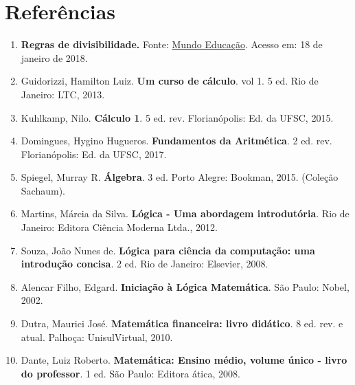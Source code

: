 \chapter*{Referências}
 
 \begin{enumerate}[(1)]
  \item \textbf{Regras de divisibilidade.} Fonte: \href{http://mundoeducacao.bol.uol.com.br/matematica/regras-divisibilidade.htm}{Mundo Educação}. Acesso em: 18 de janeiro de 2018.
  
  \item Guidorizzi, Hamilton Luiz. \textbf{Um curso de cálculo}. vol 1. 5 ed. Rio de Janeiro: LTC, 2013.
  
  \item Kuhlkamp, Nilo. \textbf{Cálculo 1}. 5 ed. rev. Florianópolis: Ed. da UFSC, 2015.
  
  \item Domingues, Hygino Hugueros. \textbf{Fundamentos da Aritmética}. 2 ed. rev. Florianópolis: Ed. da UFSC, 2017.
  
  \item Spiegel, Murray R. \textbf{Álgebra}. 3 ed. Porto Alegre: Bookman, 2015. (Coleção Sachaum).
  
  \item Martins, Márcia da Silva. \textbf{Lógica - Uma abordagem introdutória}. Rio de Janeiro: Editora Ciência Moderna Ltda., 2012.
  
  \item Souza, João Nunes de. \textbf{Lógica para ciência da computação: uma introdução concisa}. 2 ed. Rio de Janeiro: Elsevier, 2008.
  
  \item Alencar Filho, Edgard. \textbf{Iniciação à Lógica Matemática}. São Paulo: Nobel, 2002.
  
  \item Dutra, Maurici José. \textbf{Matemática financeira: livro didático}. 8 ed. rev. e atual. Palhoça: UnisulVirtual, 2010.
  
  \item Dante, Luiz Roberto. \textbf{Matemática: Ensino médio, volume único - livro do professor}. 1 ed. São Paulo: Editora ática, 2008.
 
  \end{enumerate}
